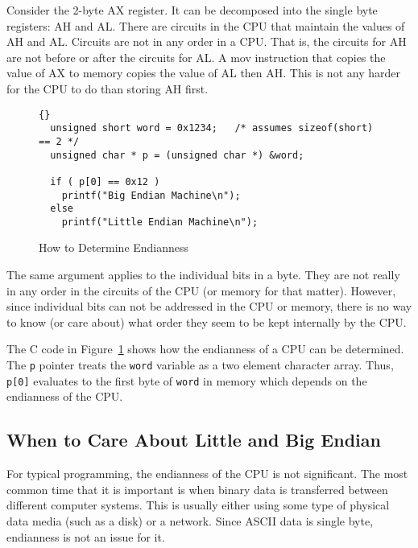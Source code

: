 Consider the 2-byte {\code AX} register. It can be decomposed into the
single byte registers: {\code AH} and {\code AL}. There are circuits
in the CPU that maintain the values of {\code AH} and {\code
AL}. Circuits are not in any order in a CPU. That is, the circuits for
{\code AH} are not before or after the circuits for {\code AL}. A
{\code mov} instruction that copies the value of {\code AX} to memory
copies the value of {\code AL} then {\code AH}. This is not any harder
for the CPU to do than storing {\code AH} first.

\begin{figure}[t]
\begin{lstlisting}[stepnumber=0,frame=tblr]{}
  unsigned short word = 0x1234;   /* assumes sizeof(short) == 2 */
  unsigned char * p = (unsigned char *) &word;

  if ( p[0] == 0x12 )
    printf("Big Endian Machine\n");
  else
    printf("Little Endian Machine\n");
\end{lstlisting}
\caption{How to Determine Endianness \label{fig:determineEndian}}
\end{figure}

The same argument applies to the individual bits in a byte. They are
not really in any order in the circuits of the CPU (or memory for that
matter). However, since individual bits can not be addressed in the
CPU or memory, there is no way to know (or care about) what order they
seem to be kept internally by the CPU.

The C code in Figure~\ref{fig:determineEndian} shows how the
endianness of a CPU can be determined.  The \lstinline|p| pointer
treats the \lstinline|word| variable as a two element character
array. Thus, \lstinline|p[0]| evaluates to the first byte of
\lstinline|word| in memory which depends on the endianness of the CPU.

\subsection{When to Care About Little and Big Endian}

For typical programming, the endianness of the CPU is not
significant. The most common time that it is important is when binary
data is transferred between different computer systems. This is
usually either using some type of physical data media (such as a disk)
or a network.  Since ASCII data
is single byte, endianness is not an issue for it.

